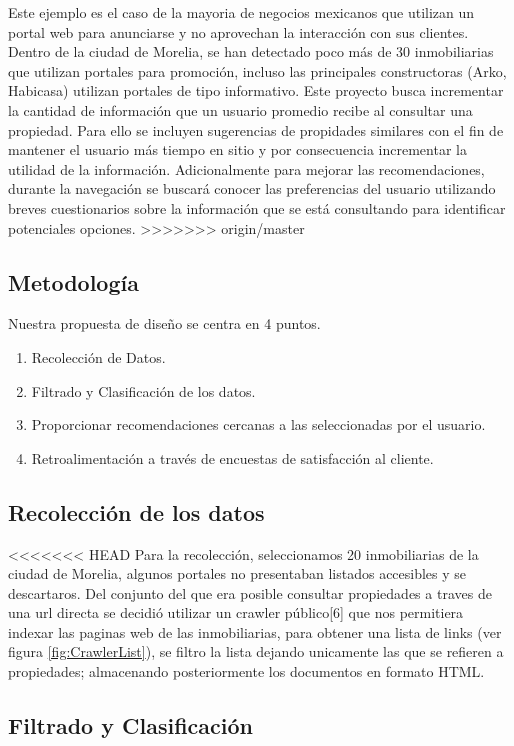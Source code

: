 Este ejemplo es el caso de la mayoria de negocios mexicanos que utilizan un portal web para anunciarse y no aprovechan la interacción con sus clientes.
Dentro de la ciudad de Morelia, se han detectado poco más de 30 inmobiliarias que utilizan portales para promoción, incluso las principales constructoras (Arko, Habicasa) utilizan  portales de tipo informativo. Este proyecto busca incrementar la cantidad de información que un usuario promedio recibe al consultar una propiedad. Para ello se incluyen sugerencias de propidades similares con el fin de mantener el usuario más tiempo en sitio y por consecuencia incrementar la utilidad de la información. Adicionalmente para mejorar las recomendaciones, durante la navegación se buscará conocer las preferencias del usuario utilizando  breves cuestionarios sobre la información que se está consultando para identificar potenciales opciones. 
>>>>>>> origin/master

\subsection{Metodología}

Nuestra propuesta de diseño se centra en 4 puntos.
\begin{enumerate}
\item Recolección de Datos.
\item Filtrado y Clasificación de los datos.
\item Proporcionar recomendaciones cercanas a las seleccionadas por el usuario.
\item Retroalimentación a través de encuestas de satisfacción al cliente.
\end{enumerate}


\subsection{Recolección de los datos}

<<<<<<< HEAD
Para la recolección, seleccionamos 20 inmobiliarias de la ciudad de Morelia, algunos portales no presentaban listados accesibles y se descartaros.
Del conjunto del que era posible consultar propiedades a traves de una url directa se decidió  utilizar un crawler público{[}6{]} que nos permitiera indexar las paginas web de las inmobiliarias, para obtener una lista de links (ver figura \ref{fig:CrawlerList}), se filtro la lista dejando unicamente las que se refieren a propiedades; almacenando posteriormente los documentos en formato HTML. 
\subsection{Filtrado y Clasificación}

